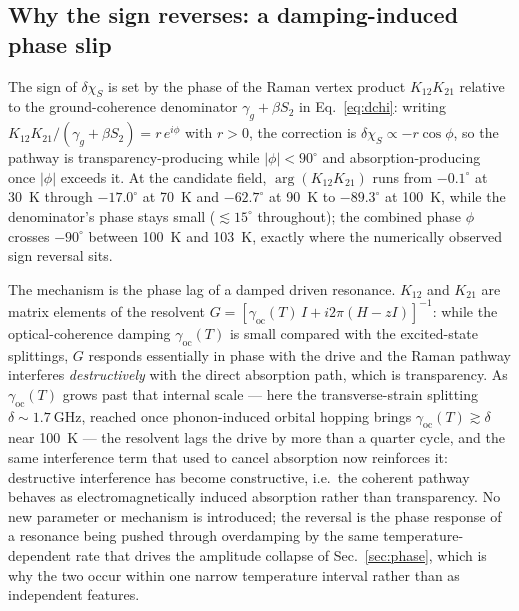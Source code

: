 \documentclass[
  reprint,
  amsmath,amssymb,
  aps,pra,
  superscriptaddress,
  floatfix,
]{revtex4-2}
\newcommand{\dchi}{\delta\chi_{S}}
\begin{document}
\subsection{Why the sign reverses: a damping-induced phase slip}
\label{sec:phaseslip}

The sign of $\dchi$ is set by the phase of the Raman vertex product
$K_{12}K_{21}$ relative to the ground-coherence denominator
$\gamma_g+\beta S_2$ in Eq.~\eqref{eq:dchi}: writing
$K_{12}K_{21}/(\gamma_g+\beta S_2)=r\,e^{i\phi}$ with $r>0$, the correction is
$\dchi\propto-r\cos\phi$, so the pathway is transparency-producing while
$|\phi|<90^\circ$ and absorption-producing once $|\phi|$ exceeds it. At the
candidate field, $\arg(K_{12}K_{21})$ runs from $-0.1^\circ$ at
\SI{30}{\kelvin} through $-17.0^\circ$ at \SI{70}{\kelvin} and $-62.7^\circ$
at \SI{90}{\kelvin} to $-89.3^\circ$ at \SI{100}{\kelvin}, while the
denominator's phase stays small ($\lesssim15^\circ$ throughout); the combined
phase $\phi$ crosses $-90^\circ$ between \SI{100}{\kelvin} and
\SI{103}{\kelvin}, exactly where the numerically observed sign reversal sits.

The mechanism is the phase lag of a damped driven resonance. $K_{12}$ and
$K_{21}$ are matrix elements of the resolvent
$G=[\gamma_{\mathrm{oc}}(T)\,I+i2\pi(H-zI)]^{-1}$: while the
optical-coherence damping $\gamma_{\mathrm{oc}}(T)$ is small compared with the
excited-state splittings, $G$ responds essentially in phase with the drive and
the Raman pathway interferes \emph{destructively} with the direct absorption
path, which is transparency. As $\gamma_{\mathrm{oc}}(T)$ grows past that
internal scale --- here the transverse-strain splitting
$\delta\sim\SI{1.7}{\giga\hertz}$, reached once phonon-induced orbital hopping
brings $\gamma_{\mathrm{oc}}(T)\gtrsim\delta$ near \SI{100}{\kelvin} --- the
resolvent lags the drive by more than a quarter cycle, and the same
interference term that used to cancel absorption now reinforces it:
destructive interference has become constructive, i.e.\ the coherent pathway
behaves as electromagnetically induced absorption rather than transparency. No
new parameter or mechanism is introduced; the reversal is the phase response
of a resonance being pushed through overdamping by the same
temperature-dependent rate that drives the amplitude collapse of
Sec.~\ref{sec:phase}, which is why the two occur within one narrow temperature
interval rather than as independent features.
\end{document}
